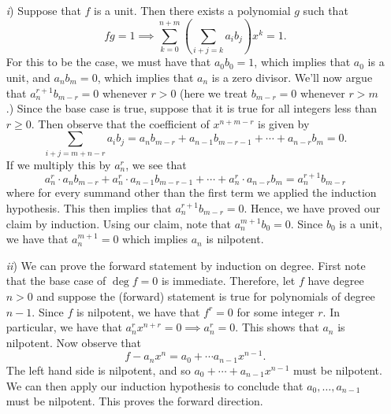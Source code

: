 \documentclass[10pt]{amsart}
\begin{document}
\begin{solution}
    \begin{itemize}
        \item[\emph{i})] Suppose that $f$ is a unit. Then there exists a polynomial $g$ such that 
        \[
            fg = 1 \implies \sum_{k = 0}^{n + m}\left( \sum_{i + j = k} a_ib_j \right)x^k = 1.
        \] 
        For this to be the case, we must have that $a_0b_0 = 1$, which implies that $a_0$ is a unit, 
        and $a_nb_m = 0$, which implies that $a_n$ is a zero divisor. We'll now argue that $a_n^{r+1}b_{m-r} = 0$ whenever 
        $r > 0$ (here we treat $b_{m-r} = 0$ whenever $r > m$.)
        Since the base case is true, suppose that it is true for all integers less than $r \ge 0$. 
        Then observe that the coefficient of $x^{n+m-r}$ is given by 
        \[
            \sum_{i + j = m+n-r} a_ib_j = a_nb_{m-r} + a_{n-1}b_{m-r-1} 
            + \cdots +
            a_{n-r}b_{m}
            =
            0.
        \]
        If we multiply this by $a_n^{r}$, we see that
        \[
            a_n^r \cdot a_nb_{m-r} + a_n^r \cdot a_{n-1}b_{m-r-1} 
            + \cdots +
            a_n^r \cdot a_{n-r}b_{m}
            =
            a_n^{r+1}b_{m-r}
        \] 
        where for every summand other than the first term we applied the induction hypothesis. 
        This then implies that $a_n^{r+1}b_{m-r} = 0$. Hence, we have proved our claim by 
        induction.
        Using our claim, note that $a_n^{m+1}b_0 = 0$. Since $b_0$ is a unit, we have that 
        $a_n^{m+1}=0$ which implies $a_n$ is nilpotent. 

        \item[\emph{ii})] 
        We can prove the forward statement by induction on degree. First note that 
        the base case of $\deg f = 0$ is immediate. Therefore, let $f$ have degree $n > 0$
        and suppose the (forward) statement is true for polynomials of degree $n-1$. 
        Since $f$ is nilpotent, we have that $f^r = 0$ for some integer $r$. In particular, we have that 
        $a_n^rx^{n+r} = 0 \implies a_n^r =0$. This shows that $a_n$ is nilpotent. Now observe that 
        \[
            f - a_nx^n = a_0 + \cdots a_{n-1}x^{n-1}.
        \]
        The left hand side is nilpotent, and so $a_0 + \cdots + a_{n-1}x^{n-1}$ must be nilpotent. 
        We can then apply our induction hypothesis to conclude that $a_0, \dots, a_{n-1}$ must be nilpotent. 
        This proves the forward direction. 


\end{itemize}
\end{solution}
\end{document}
